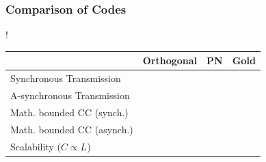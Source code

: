 \documentclass{beamer}
\newcommand{\cmark}{\ding{51}}%
\newcommand{\xmark}{\ding{55}}%
\begin{document}
	\begin{frame}\frametitle{Comparison of Codes}
		

		\begin{table}
			\centering
			\resizebox {\textwidth} {!} {
				\begin{tabular}{ | l | l | l | l | }

					\hline
																	& Orthogonal 	& PN 		& Gold 		\\ \hline
					Synchronous	Transmission						& \cmark		& \cmark	& \cmark	\\ \hline
					A-synchronous Transmission						& \xmark		& \cmark	& \cmark	\\ \hline
					Math. bounded CC (synch.)						& \cmark		& \xmark	& \cmark	\\ \hline
					Math. bounded CC (asynch.)						& \xmark		& \xmark	& \cmark	\\ \hline
					Scalability ($C \propto L$)						& \cmark		& \xmark	& \cmark	\\ \hline		


				\end{tabular}
			}

		\end{table}
	\end{frame}
\end{document}
